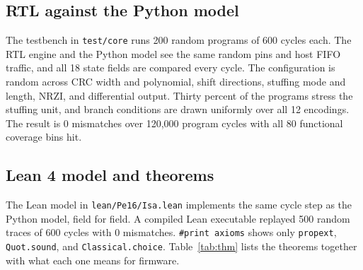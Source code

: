 \documentclass[11pt]{article}
\begin{document}
\subsection{RTL against the Python model}
The testbench in \texttt{test/core} runs 200 random programs of 600 cycles each.
The RTL engine and the Python model see the same random pins and host FIFO traffic, and all 18 state fields are compared every cycle.
The configuration is random across CRC width and polynomial, shift directions, stuffing mode and length, NRZI, and differential output.
Thirty percent of the programs stress the stuffing unit, and branch conditions are drawn uniformly over all 12 encodings.
The result is 0 mismatches over 120,000 program cycles with all 80 functional coverage bins hit.

\subsection{Lean 4 model and theorems}
The Lean model in \texttt{lean/Pe16/Isa.lean} implements the same cycle step as the Python model, field for field.
A compiled Lean executable replayed 500 random traces of 600 cycles with 0 mismatches.
\texttt{\#print axioms} shows only \texttt{propext}, \texttt{Quot.sound}, and \texttt{Classical.choice}.
Table~\ref{tab:thm} lists the theorems together with what each one means for firmware.
\end{document}
